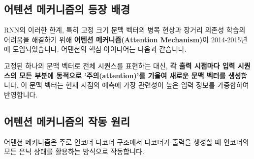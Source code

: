 \documentclass[11pt,a4paper]{article}
\theoremstyle{definition}
\begin{document}
\subsection{어텐션 메커니즘의 등장 배경}
RNN의 이러한 한계, 특히 고정 크기 문맥 벡터의 병목 현상과 장거리 의존성 학습의 어려움을 해결하기 위해 \textbf{어텐션 메커니즘(Attention Mechanism)}이 2014-2015년에 도입되었습니다. 어텐션의 핵심 아이디어는 다음과 같습니다.

\begin{tcolorbox}[mybox, title={어텐션 메커니즘의 핵심 아이디어: 동적 문맥 표현}]
고정된 하나의 문맥 벡터로 전체 시퀀스를 표현하는 대신, \textbf{각 출력 시점마다 입력 시퀀스의 모든 부분에 동적으로 '주의(attention)'를 기울여 새로운 문맥 벡터를 생성}합니다. 이 문맥 벡터는 현재 시점의 예측에 가장 관련성이 높은 입력 정보를 가중합하여 반영합니다.
\end{tcolorbox}

\subsection{어텐션 메커니즘의 작동 원리}
어텐션 메커니즘은 주로 인코더-디코더 구조에서 디코더가 출력을 생성할 때 인코더의 모든 은닉 상태를 활용하는 방식으로 작동합니다.
\end{document}
